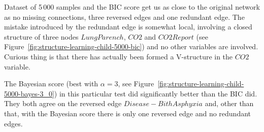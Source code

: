 \documentclass[english,cover]{fitthesis} %
\begin{document}
Dataset of 5\,000 samples and the BIC score get us as close to the original network as no missing connections, three reversed edges and one redundant edge. The mistake introduced by the redundant edge is somewhat local, involving a closed structure of three nodes $LungParench$, $CO2$ and $CO2Report$ (see Figure~\ref{fig:structure-learning-child-5000-bic}) and no other variables are involved. Curious thing is that there has actually been formed a V-structure in the $CO2$ variable.

The Bayesian score (best with $\alpha=3$, see Figure~\ref{fig:structure-learning-child-5000-bayes-3_0}) in this particular test did significantly better than the BIC did. They both agree on the reversed edge $Disease - BithAsphyxia$ and, other than that, with the Bayesian score there is only one reversed edge and no redundant edges.
\end{document}
